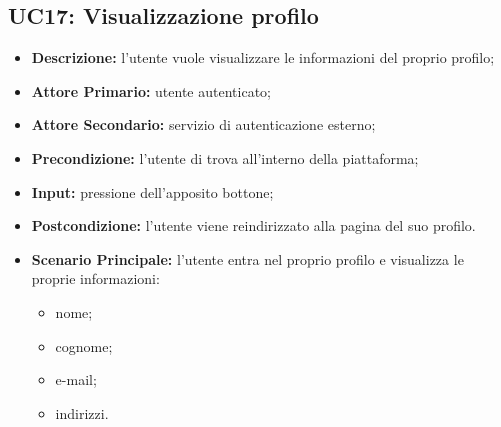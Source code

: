 \subsection{UC17: Visualizzazione profilo}
\label{sec:UC17}
\begin{itemize}
    \item \textbf{Descrizione:} l'utente vuole visualizzare le informazioni del proprio profilo;
    \item \textbf{Attore Primario:} utente autenticato;
    \item \textbf{Attore Secondario:} servizio di autenticazione esterno;
    \item \textbf{Precondizione:} l'utente di trova all'interno della piattaforma;
    \item \textbf{Input:} pressione dell'apposito bottone;
    \item \textbf{Postcondizione:} l'utente viene reindirizzato alla pagina del suo profilo.
    \item \textbf{Scenario Principale:} l'utente entra nel proprio profilo e visualizza le proprie informazioni:
    \begin{itemize}
        \item nome;
        \item cognome;
        \item e-mail;
        \item indirizzi.
    \end{itemize}
\end{itemize}